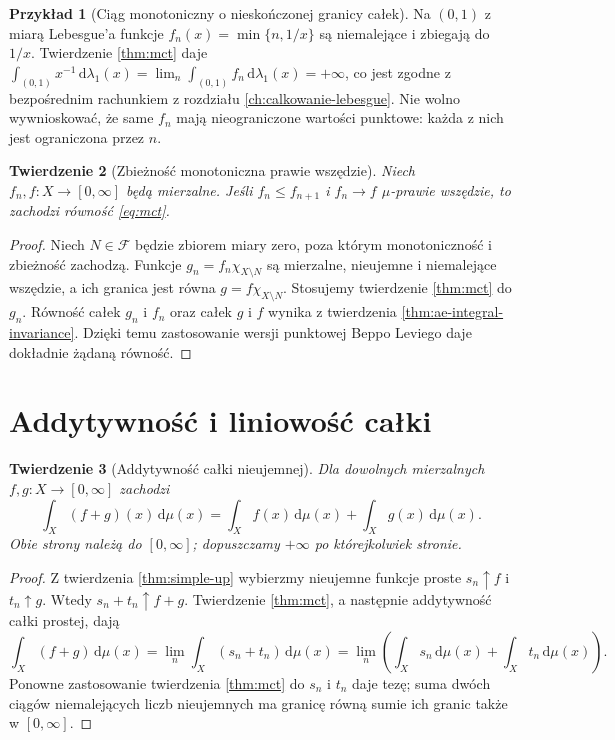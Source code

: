 \documentclass[11pt,a4paper,oneside]{book}
\numberwithin{equation}{chapter}
\theoremstyle{plain}
\newtheorem{twierdzenie}{Twierdzenie}[chapter]
\theoremstyle{definition}
\newtheorem{przyklad}[twierdzenie]{Przykład}
\theoremstyle{remark}
\begin{document}
\begin{przyklad}[Ciąg monotoniczny o nieskończonej granicy całek]
Na $(0,1)$ z miarą Lebesgue'a funkcje
$f_n(x)=\min\{n,1/x\}$ są niemalejące i zbiegają
do $1/x$. Twierdzenie \ref{thm:mct} daje
$\int_{(0,1)}x^{-1}\,\mathrm d\lambda_1(x)=
\lim_n\int_{(0,1)}f_n\,\mathrm d\lambda_1(x)=+\infty$,
co jest zgodne z bezpośrednim rachunkiem z
rozdziału \ref{ch:calkowanie-lebesgue}.
Nie wolno wywnioskować, że same $f_n$ mają
nieograniczone wartości punktowe: każda z nich
jest ograniczona przez $n$.
\end{przyklad}

\begin{twierdzenie}[Zbieżność monotoniczna prawie wszędzie]
\label{thm:mct-ae}
Niech $f_n,f:X\to[0,\infty]$ będą mierzalne.
Jeśli $f_n\le f_{n+1}$ i $f_n\to f$
$\mu$-prawie wszędzie, to zachodzi równość
\eqref{eq:mct}.
\end{twierdzenie}
\begin{proof}
Niech $N\in\mathcal F$ będzie zbiorem miary zero,
poza którym monotoniczność i zbieżność zachodzą.
Funkcje $g_n=f_n\chi_{X\setminus N}$
są mierzalne, nieujemne i niemalejące wszędzie,
a ich granica jest równa
$g=f\chi_{X\setminus N}$.
Stosujemy twierdzenie \ref{thm:mct} do $g_n$.
Równość całek $g_n$ i $f_n$ oraz całek $g$ i $f$
wynika z twierdzenia \ref{thm:ae-integral-invariance}.
Dzięki temu zastosowanie wersji punktowej
Beppo Leviego daje dokładnie żądaną równość.
\end{proof}

\section{Addytywność i liniowość całki}

\begin{twierdzenie}[Addytywność całki nieujemnej]
\label{thm:positive-additivity}
Dla dowolnych mierzalnych $f,g:X\to[0,\infty]$
zachodzi
\begin{equation}\label{eq:positive-additivity}
\int_X(f+g)(x)\,\mathrm d\mu(x)
=\int_Xf(x)\,\mathrm d\mu(x)+
\int_Xg(x)\,\mathrm d\mu(x).
\end{equation}
Obie strony należą do $[0,\infty]$; dopuszczamy
$+\infty$ po którejkolwiek stronie.
\end{twierdzenie}
\begin{proof}
Z twierdzenia \ref{thm:simple-up} wybierzmy
nieujemne funkcje proste $s_n\uparrow f$ i
$t_n\uparrow g$. Wtedy $s_n+t_n\uparrow f+g$.
Twierdzenie \ref{thm:mct}, a następnie addytywność
całki prostej, dają
\[
\int_X(f+g)\,\mathrm d\mu(x)
=\lim_n\int_X(s_n+t_n)\,\mathrm d\mu(x)
=\lim_n\left(\int_Xs_n\,\mathrm d\mu(x)+
\int_Xt_n\,\mathrm d\mu(x)\right).
\]
Ponowne zastosowanie twierdzenia \ref{thm:mct}
do $s_n$ i $t_n$ daje tezę; suma dwóch ciągów
niemalejących liczb nieujemnych ma granicę równą
sumie ich granic także w $[0,\infty]$.
\end{proof}
\end{document}
